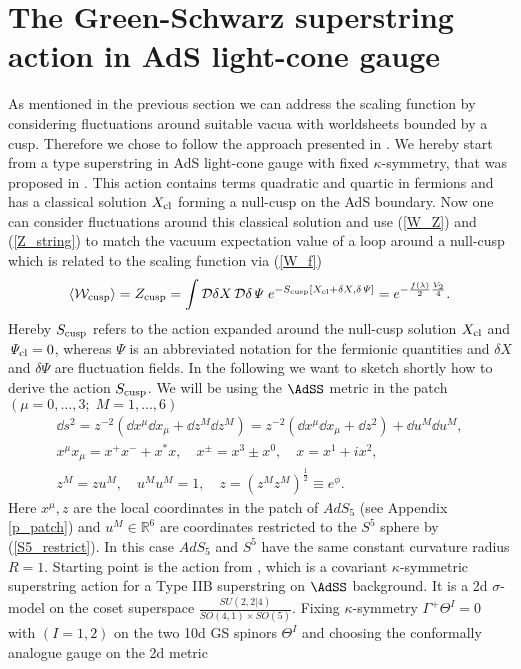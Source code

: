 \section{The Green-Schwarz superstring action in AdS light-cone gauge}
As mentioned in the previous section we can address the scaling function by considering fluctuations around suitable vacua with worldsheets bounded by a cusp. Therefore we chose to follow the approach presented in \cite{Giombi:2009gd}. We hereby start from a  type superstring in AdS light-cone gauge with fixed $\kappa$-symmetry, that was proposed in \cite{Metsaev:2000yf,Metsaev:2000yu}. This action contains terms quadratic and quartic in fermions and has a classical solution $X_{\rm cl}$ forming a null-cusp on the AdS boundary. Now one can consider fluctuations around this classical solution and use (\ref{W_Z}) and (\ref{Z_string}) to match the vacuum expectation value of a  loop around a null-cusp which is related to the scaling function via (\ref{W_f})
%
%
\begin{equation}
\langle \mathcal{W}_{\rm cusp} \rangle =Z_{\rm cusp}= \int \mathcal{D}\delta X\, \mathcal{D}\delta \mathit{\Psi}\; e^{-S_{\rm cusp}[X_{\rm cl} + \delta X,\delta \mathit{\Psi}]} = e^{-\frac{f(\lambda)}{2}\frac{V_{2}}{4}}.
\label{eq: W_S_cusp}
\end{equation}
%
%
Hereby $S_{\rm cusp}$ refers to the action expanded around the null-cusp solution $X_{\rm cl}$ and $\mathit{\Psi}_{\rm cl} = 0$, whereas $\mathit{\Psi}$ is an abbreviated notation for the fermionic quantities and $\delta X$ and $\delta\mathit{\Psi}$ are fluctuation fields. In the following we want to sketch shortly how to derive the action $S_{\rm cusp}$. We will be using the $\AdSS$ metric in the  patch $(\mu = 0,\ldots,3; \; M=1,\ldots,6)$
%
%
\begin{gather}
\dd s^{2} = z^{-2}\left( \dd x^{\mu}\dd x_{\mu} + \dd z^{M} \dd z^{M} \right) = z^{-2} \left(\dd x^{\mu}\dd x_{\mu} + \dd z^{2}\right) + \dd u^{M}\dd u^{M}, \\
x^{\mu}x_{\mu} = x^{+}x^{-} + x^{*}x, \quad x^{\pm} = x^{3}\pm x^{0}, \quad  x = x^{1} +ix^{2}, \\
z^{M} = zu^{M}, \quad  u^{M}u^{M} = 1, \quad  z=\left(z^{M}z^{M}\right)^{\frac{1}{2}} \equiv e^{\phi}. \label{S5_restrict}
\end{gather}
%
%
Here $x^{\mu},z$ are the local coordinates in the  patch of $AdS_{5}$ (see Appendix \ref{p_patch}) and $u^{M}\in \mathbb{R}^{6}$ are  coordinates restricted to the $S^{5}$ sphere by (\ref{S5_restrict}). In this case $AdS_{5}$ and $S^{5}$ have the same constant curvature radius $R=1$. Starting point is the action from \cite{Metsaev:1998it}, which is a covariant $\kappa$-symmetric superstring action for a Type IIB superstring on $\AdSS$ background. It is a 2d $\sigma$-model on the coset superspace $\frac{SU(2,2\vert 4)}{SO(4,1)\times SO(5)}$. Fixing $\kappa$-symmetry $\Gamma^{+}\mathit{\Theta}^{I}=0$ with $(I=1,2)$ on the two 10d  GS spinors $\mathit{\Theta}^{I}$  and choosing the conformally analogue gauge on the 2d metric
